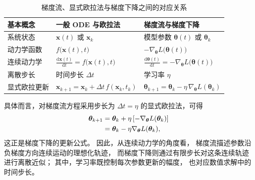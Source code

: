 \documentclass[UTF8,a4paper,zihao=-4,oneside,openany]{ctexbook}
\begin{document}
\begin{table}[htbp]
    \centering
    \caption{梯度流、显式欧拉法与梯度下降之间的对应关系}
    \label{tab:gradient-flow-gradient-descent}
    \renewcommand{\arraystretch}{1.35}
    \begin{tabular}{
        >{\centering\arraybackslash}p{}
        >{\centering\arraybackslash}p{}
        >{\centering\arraybackslash}p{}
    }
        \toprule
        \textbf{基本概念}
        &
        \textbf{一般 ODE 与欧拉法}
        &
        \textbf{梯度流与梯度下降}
        \\
        \midrule

        系统状态
        &
        \(\boldsymbol{x}(t)\) 或 \(\boldsymbol{x}_k\)
        &
        模型参数
        \(\boldsymbol{\theta}(t)\) 或 \(\boldsymbol{\theta}_k\)
        \\

        动力学函数
        &
        \(f\bigl(\boldsymbol{x}(t),t\bigr)\)
        &
        \(-\nabla_{\boldsymbol{\theta}}
        L\bigl(\boldsymbol{\theta}(t)\bigr)\)
        \\

        连续动力学
        &
        \(\displaystyle
        \frac{\mathrm{d}\boldsymbol{x}(t)}{\mathrm{d}t}
        =
        f\bigl(\boldsymbol{x}(t),t\bigr)\)
        &
        \(\displaystyle
        \frac{\mathrm{d}\boldsymbol{\theta}(t)}{\mathrm{d}t}
        =
        -
        \nabla_{\boldsymbol{\theta}}
        L\bigl(\boldsymbol{\theta}(t)\bigr)\)
        \\

        离散步长
        &
        时间步长 \(\Delta t\)
        &
        学习率 \(\eta\)
        \\

        显式欧拉更新
        &
        \(\displaystyle
        \boldsymbol{x}_{k+1}
        =
        \boldsymbol{x}_k
        +
        \Delta t\,
        f(\boldsymbol{x}_k,t_k)\)
        &
        \(\displaystyle
        \boldsymbol{\theta}_{k+1}
        =
        \boldsymbol{\theta}_k
        -
        \eta\,
        \nabla_{\boldsymbol{\theta}}
        L(\boldsymbol{\theta}_k)\)
        \\

        \bottomrule
    \end{tabular}
\end{table}

具体而言，对梯度流方程采用步长为
\(\Delta t=\eta\)
的显式欧拉法，可得
\begin{align}
    \boldsymbol{\theta}_{k+1}
    &=
    \boldsymbol{\theta}_k
    +
    \eta
    \left[
        -
        \nabla_{\boldsymbol{\theta}}
        L(\boldsymbol{\theta}_k)
    \right]
    \notag\\
    &=
    \boldsymbol{\theta}_k
    -
    \eta
    \nabla_{\boldsymbol{\theta}}
    L(\boldsymbol{\theta}_k),
    \label{eq:gradient-descent-as-euler}
\end{align}
这正是梯度下降的更新公式。
因此，从连续动力学的角度看，
梯度流描述参数沿负梯度方向连续运动的理想化轨迹，
而梯度下降则通过有限步长对这条连续轨迹进行离散近似；
其中，学习率既控制每次参数更新的幅度，
也对应数值求解中的时间步长。
\end{document}
